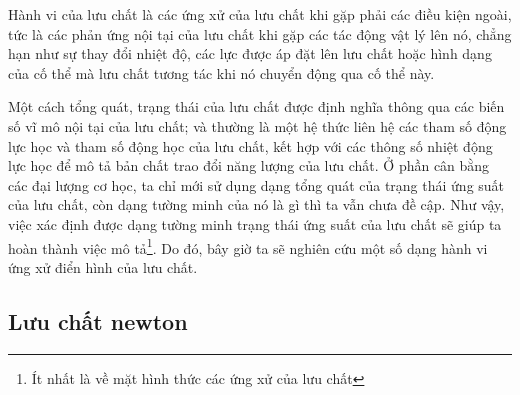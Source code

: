 \documentclass[../../../main.tex]{subfiles}
\begin{document}
Hành vi của lưu chất là các ứng xử của lưu chất khi gặp phải các điều kiện ngoài, tức là các phản ứng nội tại của lưu chất khi gặp các tác động vật lý lên nó, chẳng hạn như sự thay đổi nhiệt độ, các lực được áp đặt lên lưu chất hoặc hình dạng của cố thể mà lưu chất tương tác khi nó chuyển động qua cố thể này.

Một cách tổng quát, trạng thái của lưu chất được định nghĩa thông qua các biến số vĩ mô nội tại của lưu chất; và thường là một hệ thức liên hệ các tham số động lực học và tham số động học của lưu chất, kết hợp với các thông số nhiệt động lực học để mô tả bản chất trao đổi năng lượng của lưu chất. Ở phần cân bằng các đại lượng cơ học, ta chỉ mới sử dụng dạng tổng quát của trạng thái ứng suất của lưu chất, còn dạng tường minh của nó là gì thì ta vẫn chưa đề cập. Như vậy, việc xác định được dạng tường minh trạng thái ứng suất của lưu chất sẽ giúp ta hoàn thành việc mô tả\footnote{Ít nhất là về mặt hình thức các ứng xử của lưu chất}. Do đó, bây giờ ta sẽ nghiên cứu một số dạng hành vi ứng xử điển hình của lưu chất.
\subsection{Lưu chất newton}
\end{document}
